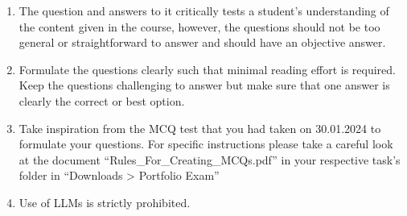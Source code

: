 \begin{enumerate}
    \begin{enumerate}
        \item The question and answers to it critically tests a student’s understanding of the content given in the course, however, the questions should not be too general or straightforward to answer and should have an objective answer.  
        \item Formulate the questions clearly such that minimal reading effort is required. Keep the questions challenging to answer but make sure that one answer is clearly the correct or best option. 
        \item Take inspiration from the MCQ test that you had taken on 30.01.2024 to formulate your questions. For specific instructions please take a careful look at the document “Rules\_For\_Creating\_MCQs.pdf” in your respective task’s folder in “Downloads > Portfolio Exam”
        \item Use of LLMs is strictly prohibited.

    \end{enumerate}
        
    
\end{enumerate}




 

 

